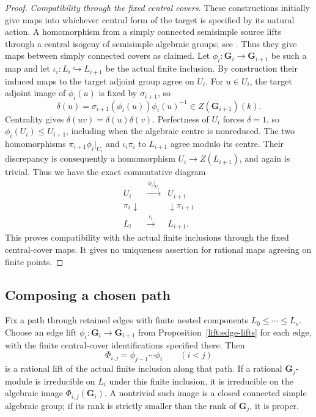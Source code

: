\begin{proof}
\smallskip\noindent
\emph{Compatibility through the fixed central covers.}
These constructions initially give maps into whichever central form
of the target is specified by its natural action.  A homomorphism
from a simply connected semisimple source lifts through a central
isogeny of semisimple algebraic groups; see
\cite[author version, Exercise~6.5.2(iii), p.~236]{Conrad2014}.  Thus they give maps
between simply connected covers as claimed.  Let
$\phi_i:\mathbf G_i\to\mathbf G_{i+1}$ be such a map and let
$\iota_i:L_i\hookrightarrow L_{i+1}$ be the actual finite inclusion.
By construction their induced maps to the target adjoint group
agree on $U_i$.  For $u\in U_i$, the target adjoint image of
$\phi_i(u)$ is fixed by $\sigma_{i+1}$, so
\[
 \delta(u)=\sigma_{i+1}(\phi_i(u))\phi_i(u)^{-1}
       \in Z(\mathbf G_{i+1})(k).
\]
Centrality gives $\delta(uv)=\delta(u)\delta(v)$.
Perfectness of $U_i$ forces $\delta=1$, so
$\phi_i(U_i)\leq U_{i+1}$, including when the algebraic centre is
nonreduced.  The two homomorphisms
$\pi_{i+1}\phi_i|_{U_i}$ and $\iota_i\pi_i$ to $L_{i+1}$ agree
modulo its centre.  Their discrepancy is consequently a
homomorphism $U_i\to Z(L_{i+1})$, and again is trivial.  Thus we have
the exact commutative diagram
\begin{equation}\label{lift:finite-diagram}
\begin{array}{ccc}
 U_i&\xrightarrow{\ \phi_i|_{U_i}\ }&U_{i+1}\\
 \pi_i\downarrow&&\downarrow\pi_{i+1}\\
 L_i&\xrightarrow{\ \iota_i\ }&L_{i+1}.
\end{array}
\end{equation}
This proves compatibility with the actual finite inclusions through
the fixed central-cover maps.  It gives no uniqueness assertion for
rational maps agreeing on finite points.
\end{proof}

\subsection{Composing a chosen path}

\begin{lemma}\label{lift:path-lifts}
Fix a path through retained edges with finite nested components
$L_0\leq\cdots\leq L_s$.  Choose an edge lift
$\phi_i:\mathbf G_i\to\mathbf G_{i+1}$ from
Proposition~\ref{lift:edge-lifts} for each edge, with the finite
central-cover identifications specified there.  Then
\[
 \Phi_{i,j}=\phi_{j-1}\cdots\phi_i\qquad(i<j)
\]
is a rational lift of the actual finite inclusion along that path.
If a rational $\mathbf G_j$-module is irreducible on $L_i$ under this
finite inclusion, it is irreducible on the algebraic image
$\Phi_{i,j}(\mathbf G_i)$.  A nontrivial such image is a closed
connected simple algebraic group; if its rank is strictly smaller
than the rank of $\mathbf G_j$, it is proper.
\end{lemma}

